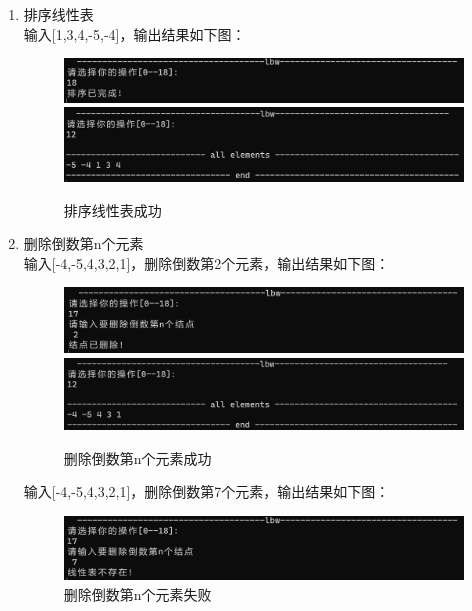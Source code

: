 \documentclass[supercite]{Experimental_Report}
\theoremstyle{definition}
\begin{document}
\begin{enumerate}
		\item 排序线性表\\
		输入[1,3,4,-5,-4]，输出结果如下图：
		\begin{figure}[H]
			\centering
			\includegraphics[width=1\linewidth]{images/排序成功.png}
			\includegraphics[width=1\linewidth]{images/排序结果.png}
			\caption{排序线性表成功}
			\label{fig1-31}
		\end{figure}
		\item 删除倒数第n个元素\\
		输入[-4,-5,4,3,2,1]，删除倒数第2个元素，输出结果如下图：
		\begin{figure}[H]
			\centering
			\includegraphics[width=1\linewidth]{images/从后删除成功.png}
			\includegraphics[width=1\linewidth]{images/从后删除结果.png}
			\caption{删除倒数第n个元素成功}
			\label{fig1-32}
		\end{figure}
	
		输入[-4,-5,4,3,2,1]，删除倒数第7个元素，输出结果如下图：
		\begin{figure}[H]
			\centering
			\includegraphics[width=1\linewidth]{images/从后删除失败.png}
			\caption{删除倒数第n个元素失败}
			\label{fig1-33}
		\end{figure}
		

\end{enumerate}
\end{document}
